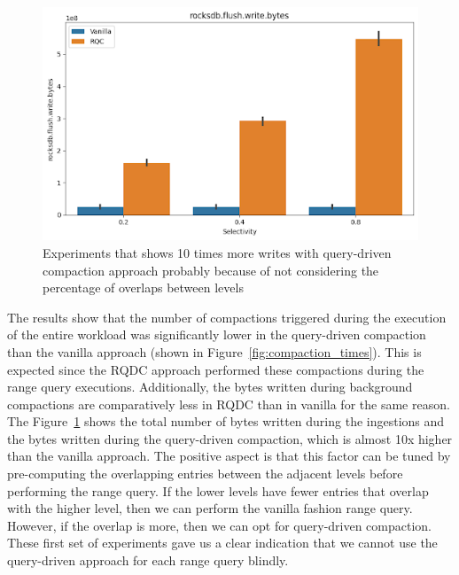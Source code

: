 \begin{figure}
    \centering
    \includegraphics[scale=0.45]{Figures/Range Query Flush Write Bytes.png}
    \caption{Experiments that shows 10 times more writes with query-driven compaction approach probably because of not 
    considering the percentage of overlaps between levels}\label{fig:range_query_flush_write_bytes}
\end{figure}

The results show that the number of compactions triggered during the execution of the entire workload was significantly 
lower in the query-driven compaction than the vanilla approach (shown in Figure~\ref{fig:compaction_times}). This is 
expected since the RQDC approach performed these compactions during the range query executions. Additionally, 
the bytes written during background compactions are comparatively less in RQDC than in vanilla for the same reason. 
The Figure~\ref{fig:range_query_flush_write_bytes} 
shows the total number of bytes written during the ingestions and the bytes written during the query-driven compaction, 
which is almost 10x higher than the vanilla approach. The positive aspect is that this factor can be tuned by pre-computing 
the overlapping entries between the adjacent levels before performing the range query. If the lower levels have fewer entries 
that overlap with the higher level, then we can perform the vanilla fashion range query. However, if the overlap is more, 
then we can opt for query-driven compaction. These first set of experiments gave us a clear indication that we cannot 
use the query-driven approach for each range query blindly.

